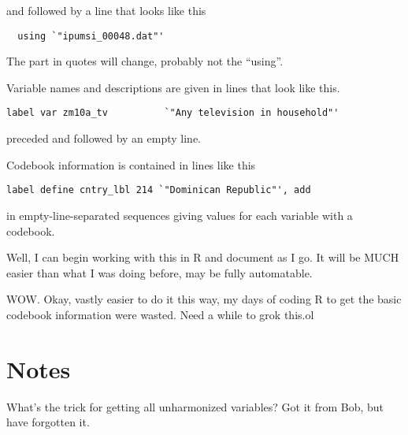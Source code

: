 and followed by a line that looks like this

\begin{verbatim}
  using `"ipumsi_00048.dat"'
\end{verbatim}

The part in quotes will change, probably not the ``using''.

Variable names and descriptions are given in lines that look like this.

\begin{verbatim}
label var zm10a_tv          `"Any television in household"'
\end{verbatim}

preceded and followed by an empty line.

Codebook information is contained in lines like this

\begin{verbatim}
label define cntry_lbl 214 `"Dominican Republic"', add
\end{verbatim}

in empty-line-separated sequences giving values for each variable with a codebook.

Well, I can begin working with this in R and document as I go. It will be MUCH easier than what I was doing before, may be fully automatable.

WOW. Okay, vastly easier to do it this way, my days of coding R to get the basic codebook information were wasted. Need a while to grok this.ol






\section{Notes}

What's the trick for getting all unharmonized variables? Got it from Bob, but have forgotten it.





